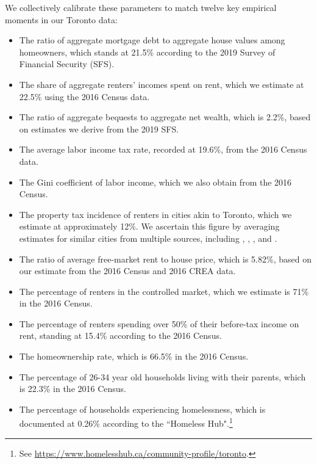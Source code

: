 \documentclass[parskip=full]{article}
\begin{document}
We collectively calibrate these parameters to match twelve key empirical moments in our Toronto data:

\begin{itemize}
    \item The ratio of aggregate mortgage debt to aggregate house values among homeowners, which stands at 21.5\% according to the 2019 Survey of Financial Security (SFS).
    \item The share of aggregate renters' incomes spent on rent, which we estimate at 22.5\% using the 2016 Census data.
    \item The ratio of aggregate bequests to aggregate net wealth, which is 2.2\%, based on estimates we derive from the 2019 SFS.
    \item The average labor income tax rate, recorded at 19.6\%, from the 2016 Census data.
    \item The Gini coefficient of labor income, which we also obtain from the 2016 Census.
    \item The property tax incidence of renters in cities akin to Toronto, which we estimate at approximately 12\%. We ascertain this figure by averaging estimates for similar cities from multiple sources, including \citet{cy-1994}, \citet{susin-2002}, \citet{fack-2006}, and \citet{sy-2020}.
    \item The ratio of average free-market rent to house price, which is 5.82\%, based on our estimate from the 2016 Census and 2016 CREA data.
    \item The percentage of renters in the controlled market, which we estimate is 71\% in the 2016 Census. 
    \item The percentage of renters spending over 50\% of their before-tax income on rent, standing at 15.4\% according to the 2016 Census. 
    \item The homeownership rate, which is 66.5\% in the 2016 Census.
    \item The percentage of 26-34 year old households living with their parents, which is 22.3\% in the 2016 Census.
    \item The percentage of households experiencing homelessness, which is documented at 0.26\% according to the ``Homeless Hub".\footnote{See \url{https://www.homelesshub.ca/community-profile/toronto}.}
\end{itemize}
\end{document}
